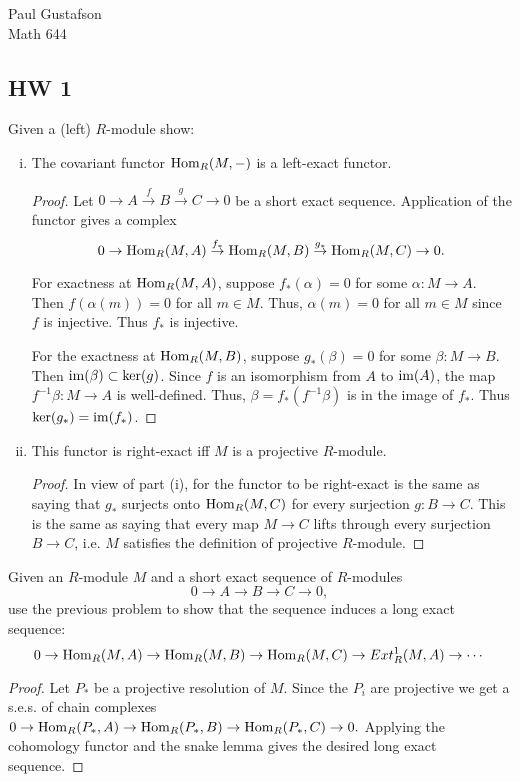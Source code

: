 \documentclass{article}
\begin{document}
\noindent Paul Gustafson\\
\noindent Math 644

\subsection*{HW 1}
 Given a (left) $R$-module show:
\begin{enumerate}[i.]
\item The covariant functor $\operatorname{Hom}_R(M,-)$ is a left-exact functor.
\begin{proof}
Let $0 \to A \overset f \to B \overset g \to C \to 0$ be a short exact sequence. Application of the functor gives a complex
$$0 \to \operatorname{Hom}_R(M, A) \overset {f_*} \to \operatorname{Hom}_R(M, B) \overset {g_*} \to 
\operatorname{Hom}_R(M,C) \to 0.$$

For exactness at $\operatorname{Hom}_R(M, A)$, suppose $f_*(\alpha) = 0$ for some $\alpha: M \to A$.  Then $f(\alpha(m)) = 0$ for all $m \in M$.  Thus, $\alpha(m) = 0$ for all $m \in M$ since $f$ is injective.  Thus $f_*$ is injective.

For the exactness at $\operatorname{Hom}_R(M, B)$, suppose $g_*(\beta) = 0$ for some $\beta: M \to B$. Then $\operatorname{im}(\beta) \subset \ker(g)$. Since $f$ is an isomorphism from $A$ to $\operatorname{im}(A)$, the map $f^{-1}\beta : M \to A$ is well-defined. Thus, $\beta = f_*(f^{-1}\beta)$ is in the image of $f_*$. Thus $\ker(g_*) = \operatorname{im}(f_*)$.
\end{proof}

\item This functor is right-exact iff $M$ is a projective $R$-module.
\begin{proof}
In view of part (i), for the functor to be right-exact is the same as saying that $g_*$ surjects onto $\operatorname{Hom}_R(M, C)$ for every surjection $g: B \to C$. This is the same as saying that every map $M \to C$ lifts through every surjection $B \to C$, i.e. $M$ satisfies the definition of projective $R$-module.
\end{proof}

\end{enumerate}

 Given an $R$-module $M$ and a short exact sequence of $R$-modules
$$0 \to A \to B \to C \to 0,$$
use the previous problem to show that the sequence induces a long exact sequence:
$$0 \to \operatorname{Hom}_R(M, A) \to \operatorname{Hom}_R(M, B) \to \operatorname{Hom}_R(M,C) \to Ext_R^1(M, A) \to \cdots$$
\begin{proof}
Let $P_*$ be a projective resolution of $M$. Since the $P_i$ are projective we get a s.e.s. of chain complexes
$0 \to \operatorname{Hom}_R(P_*, A) \to \operatorname{Hom}_R(P_*, B) \to \operatorname{Hom}_R(P_*, C) \to 0.$ Applying the cohomology functor and the snake lemma gives 
the desired long exact sequence.
\end{proof}
\end{document}
